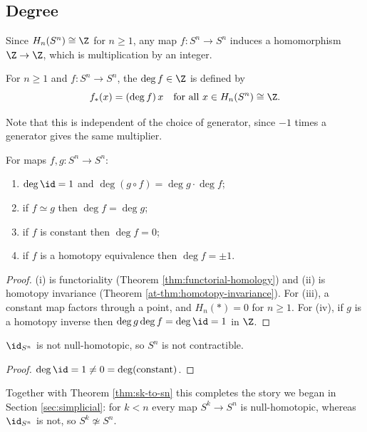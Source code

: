 \subsection{Degree}

Since $H_n(S^n)\cong\Z$ for $n \geq 1$, any map $f: S^n \to S^n$ induces a homomorphism
$\Z\to\Z$, which is multiplication by an integer.

\begin{definition}[Degree]
	For $n \geq 1$ and $f: S^n \to S^n$, the  $\deg f \in \Z$ is defined by
	$$
	f_*(x) = (\deg f)\, x \quad \text{for all } x \in H_n(S^n)\cong\Z.
	$$
\end{definition}

Note that this is independent of the choice of generator, since $-1$ times a generator
gives the same multiplier.

\begin{proposition} \label{prop:degree-props}
	For maps $f, g: S^n \to S^n$:
	\begin{enumerate}
		\item $\deg\id = 1$ and $\deg(g\circ f) = \deg g \cdot \deg f$;
		\item if $f \simeq g$ then $\deg f = \deg g$;
		\item if $f$ is constant then $\deg f = 0$;
		\item if $f$ is a homotopy equivalence then $\deg f = \pm 1$.
	\end{enumerate}
\end{proposition}
\begin{proof}
	(i) is functoriality (Theorem \ref{thm:functorial-homology}) and (ii) is homotopy invariance (Theorem \ref{at-thm:homotopy-invariance}). For (iii), a constant map factors through a point, and $H_n(*) = 0$ for $n \geq 1$. For (iv), if $g$ is a homotopy inverse then $\deg g \deg f = \deg\id = 1$ in $\Z$.
\end{proof}

\begin{corollary}
	$\id_{S^n}$ is not null-homotopic, so $S^n$ is not contractible.
\end{corollary}
\begin{proof}
	$\deg \id = 1 \neq 0 = \deg(\text{constant})$.
\end{proof}

Together with Theorem \ref{thm:sk-to-sn} this completes the story we began in Section
\ref{sec:simplicial}: for $k < n$ every map $S^k \to S^n$ is null-homotopic, whereas
$\id_{S^n}$ is not, so $S^k \not\simeq S^n$.

